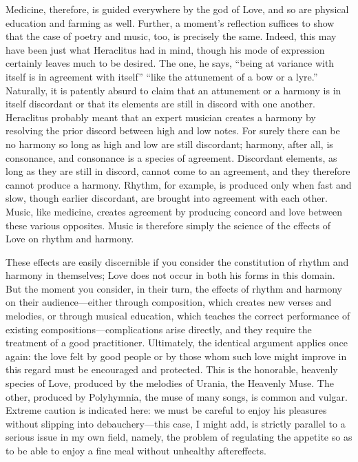  Medicine, therefore, is guided everywhere by the god of
Love, and so are physical education and farming as well. Further, a
moment's reflection suffices to show that the case of poetry and music,
too, is precisely the same. Indeed, this may have been just what
Heraclitus had in mind, though his mode of expression certainly leaves
much to be desired. The one, he says, “being at variance with itself is
in agreement with itself” “like the attunement of a bow or a
lyre.” Naturally, it
is patently absurd to claim that an attunement or a harmony is in itself
discordant or that its elements are still in discord with one another.
Heraclitus probably meant that an expert musician creates a harmony by
resolving the prior discord between  high and low notes. For
surely there can be no harmony so long as high and low are still
discordant; harmony, after all, is consonance, and consonance is a
species of agreement. Discordant elements, as long as they are still in
discord, cannot come to an agreement, and they therefore cannot produce
a harmony. Rhythm, for example, is produced only when fast and slow,
 though earlier discordant, are brought into agreement with each
other. Music, like medicine, creates agreement by producing concord and
love between these various opposites. Music is therefore simply the
science of the effects of Love on rhythm and harmony.

These effects are easily discernible if you consider the constitution of
rhythm and harmony in themselves; Love does not occur in both his forms
in this domain. But the moment you consider, in their turn, the effects
of rhythm and harmony on their audience---either through composition,
 which creates new verses and melodies, or through musical
education, which teaches the correct performance of existing
compositions---complications arise directly, and they require the
treatment of a good practitioner. Ultimately, the identical argument
applies once again: the love felt by good people or by those whom such
love might improve in this regard must be encouraged and protected. This
is the honorable, heavenly species of Love, produced by the melodies of
Urania, the Heavenly Muse.  The other, produced by Polyhymnia,
the muse of many songs, is common and vulgar. Extreme caution is
indicated here: we must be careful to enjoy his pleasures without
slipping into debauchery---this case, I might add, is strictly parallel
to a serious issue in my own field, namely, the problem of regulating
the appetite so as to be able to enjoy a fine meal without unhealthy
aftereffects.

